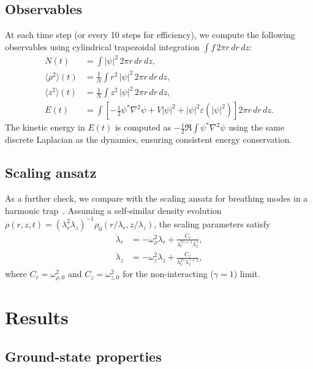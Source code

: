 \documentclass[twocolumn,superscriptaddress,aps,pra,longbibliography]{revtex4-2}
\newcommand{\avg}[1]{\langle #1 \rangle}
\begin{document}
\subsection{Observables}

At each time step (or every 10 steps for efficiency), we compute the
following observables using cylindrical trapezoidal integration
$\int f\,2\pi r\,dr\,dz$:
\begin{align}
N(t) &= \int |\psi|^2\,2\pi r\,dr\,dz, \label{eq:obs_N}\\
\avg{\rho^2}(t) &= \frac{1}{N}\int r^2\,|\psi|^2\,2\pi r\,dr\,dz,\\
\avg{z^2}(t) &= \frac{1}{N}\int z^2\,|\psi|^2\,2\pi r\,dr\,dz,\\
E(t) &= \int\!\left[-\tfrac{1}{2}\psi^*\nabla^2\psi
+ V|\psi|^2 + |\psi|^2\varepsilon(|\psi|^2)\right]
2\pi r\,dr\,dz.
\label{eq:obs_E}
\end{align}
The kinetic energy in $E(t)$ is computed as
$-\frac{1}{2}\Re\int\psi^*\nabla^2\psi$ using the same discrete Laplacian
as the dynamics, ensuring consistent energy conservation.

\subsection{Scaling ansatz}

As a further check, we compare with the scaling ansatz for breathing modes
in a harmonic trap~\cite{CastinDum1996,Kagan1996}.  Assuming a
self-similar density evolution
$\rho(r,z,t) = (\lambda_r^2\lambda_z)^{-1}\rho_0(r/\lambda_r,z/\lambda_z)$,
the scaling parameters satisfy
\begin{align}
\ddot\lambda_r &= -\omega_\rho^2\lambda_r
+ \frac{C_r}{\lambda_r^{2\gamma+1}\lambda_z^\gamma},
\label{eq:scaling_r}\\
\ddot\lambda_z &= -\omega_z^2\lambda_z
+ \frac{C_z}{\lambda_r^{2\gamma}\lambda_z^{\gamma+1}},
\label{eq:scaling_z}
\end{align}
where $C_r = \omega_{\rho,0}^2$ and $C_z = \omega_{z,0}^2$ for the
non-interacting ($\gamma=1$) limit.

\section{Results}
\label{sec:results}

\subsection{Ground-state properties}
\end{document}

